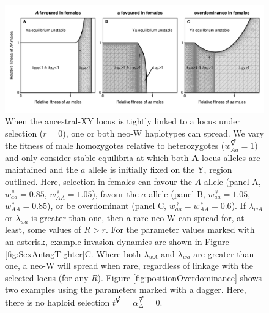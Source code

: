 \documentclass[12pt]{article}
\begin{document}
 


\begin{figure}[!h]
\centering
\centerline{\includegraphics[width=1.25\linewidth]{Region_plot_combined_Mike}}
\caption{
When the ancestral-XY locus is tightly linked to a locus under selection ($r=0$), one or both neo-W haplotypes can spread. 
We vary the fitness of male homozygotes relative to heterozygotes ($w_{Aa}^\Hermaphrodite=1$) and only consider stable equilibria at which both \textbf{A} locus alleles are maintained and the $a$ allele is initially fixed on the Y, region outlined. 
Here, selection in females can favour the $A$ allele (panel A, $w_{aa}^\female=0.85$, $w_{AA}^\female=1.05$), favour the $a$ allele (panel B, $w_{aa}^\female=1.05$, $w_{AA}^\female=0.85$), or be overdominant (panel C, $w_{aa}^\female=w_{AA}^\female=0.6$). 
If $\lambda_{wA}$ or $\lambda_{wa}$ is greater than one, then a rare neo-W can spread for, at least, some values of $R>r$. 
For the parameter values marked with an asterisk, example invasion dynamics are shown in Figure \ref{fig:SexAntagTighter}C. 
Where both $\lambda_{wA}$ and $\lambda_{wa}$ are greater than one, a neo-W will spread when rare, regardless of linkage with the selected locus (for any $R$). 
Figure \ref{fig:positionOverdominance} shows two examples using the parameters marked with a dagger. 
Here, there is no haploid selection $t^\Hermaphrodite = \alpha^\Hermaphrodite_\Delta = 0$.
}
\label{fig:regionplots}
\end{figure}


\end{document}
